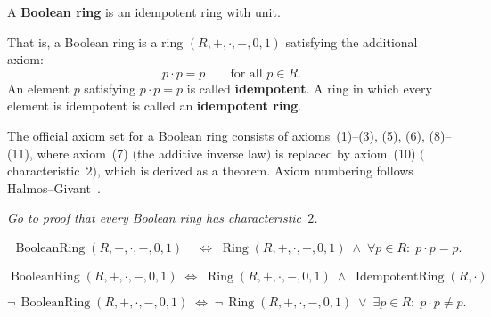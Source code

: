 
\begin{tcolorbox}[colback=defbox, colframe=defborder, arc=2pt,
  left=6pt, right=6pt, top=4pt, bottom=4pt,
  title={\small\textbf{Definition --- Boolean Ring}},
  fonttitle=\small\bfseries]
\begin{definition}
\label{def:boolean-ring}
A \textbf{Boolean ring} is an idempotent ring with unit.

That is, a Boolean ring is a ring $(R, +, \cdot, -, 0, 1)$
satisfying the additional axiom:
\[
p \cdot p = p \qquad \text{for all } p \in R. \tag{11}
\]
An element $p$ satisfying $p \cdot p = p$ is called
\textbf{idempotent}.
A ring in which every element is idempotent is called an
\textbf{idempotent ring}.

The official axiom set for a Boolean ring consists of
axioms~(1)--(3), (5), (6), (8)--(11), where axiom~(7)
$($the additive inverse law$)$ is replaced by
axiom~(10) $($characteristic~$2)$, which is derived as a theorem.
Axiom numbering follows Halmos--Givant~\cite{HalmosGivant2009}.

\smallskip
\noindent
\hyperref[prf:boolean-ring-characteristic-2]{\textit{Go to proof
that every Boolean ring has characteristic~$2$.}}
\end{definition}
\end{tcolorbox}

\begin{remark*}
\[
\begin{aligned}
\operatorname{BooleanRing}(R,+,\cdot,-,0,1)
&\;\Longleftrightarrow\;
  \operatorname{Ring}(R,+,\cdot,-,0,1)
  \;\land\;
  \forall p \in R{:}\; p \cdot p = p.
\end{aligned}
\]
\end{remark*}

\begin{remark*}
\[
\operatorname{BooleanRing}(R,+,\cdot,-,0,1)
\;\Longleftrightarrow\;
\operatorname{Ring}(R,+,\cdot,-,0,1)
\;\land\;
\operatorname{IdempotentRing}(R,\cdot)
\]
\end{remark*}

\begin{remark*}
\[
\neg\,\operatorname{BooleanRing}(R,+,\cdot,-,0,1)
\;\Longleftrightarrow\;
\neg\,\operatorname{Ring}(R,+,\cdot,-,0,1)
\;\lor\;
\exists p \in R{:}\; p \cdot p \neq p.
\]
\end{remark*}


